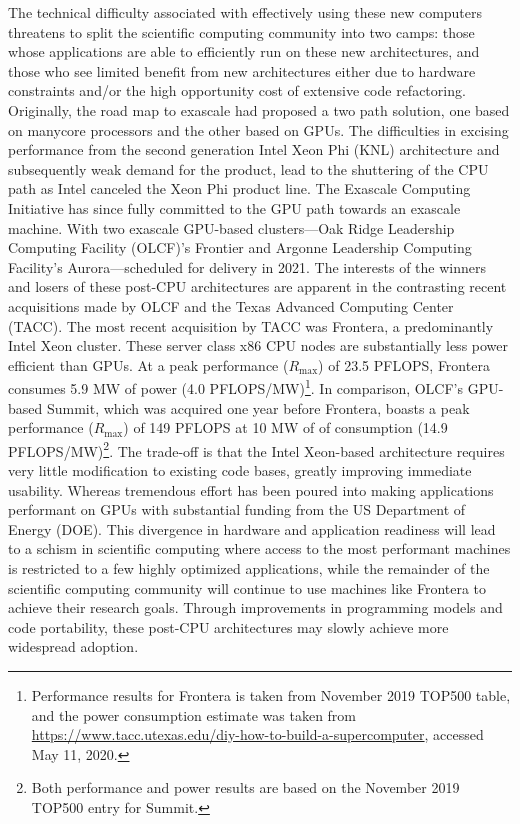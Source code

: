 The technical difficulty associated with effectively using these new computers threatens to split the scientific computing community into two camps: those whose applications are able to efficiently run on these new architectures, and those who see limited benefit from new architectures either due to hardware constraints and/or the high opportunity cost of extensive code refactoring. Originally, the road map to exascale had proposed a two path solution, one based on manycore processors and the other based on GPUs. The difficulties in excising performance from the second generation Intel Xeon Phi (KNL) architecture and subsequently weak demand for the product, lead to the shuttering of the CPU path as Intel canceled the Xeon Phi product line. The Exascale Computing Initiative has since fully committed to the GPU path towards an exascale machine. With two exascale GPU-based clusters---Oak Ridge Leadership Computing Facility (OLCF)'s Frontier and Argonne Leadership Computing Facility's Aurora---scheduled for delivery in 2021. The interests of the winners and losers of these post-CPU architectures are apparent in the contrasting recent acquisitions made by OLCF and the Texas Advanced Computing Center (TACC). The most recent acquisition by TACC was Frontera, a predominantly Intel Xeon cluster. These server class x86 CPU nodes are substantially less power efficient than GPUs. At a peak performance ($R_{\max}$) of 23.5 PFLOPS, Frontera consumes 5.9 MW of power (4.0 PFLOPS/MW)\footnote{Performance results for Frontera is taken from November 2019 TOP500 table, and the power consumption estimate was taken from \url{https://www.tacc.utexas.edu/diy-how-to-build-a-supercomputer}, accessed May 11, 2020.}. In comparison, OLCF's GPU-based Summit, which was acquired one year before Frontera, boasts a peak performance ($R_{\max}$) of 149 PFLOPS at 10 MW of of consumption (14.9 PFLOPS/MW)\footnote{Both performance and power results are based on the November 2019 TOP500 entry for Summit.}. The trade-off is that the Intel Xeon-based architecture requires very little modification to existing code bases, greatly improving immediate usability. Whereas tremendous effort has been poured into making applications performant on GPUs with substantial funding from the US Department of Energy (DOE). This divergence in hardware and application readiness will lead to a schism in scientific computing where access to the most performant machines is restricted to a few highly optimized applications, while the remainder of the scientific computing community will continue to use machines like Frontera to achieve their research goals. Through improvements in programming models and code portability, these post-CPU architectures may slowly achieve more widespread adoption.

